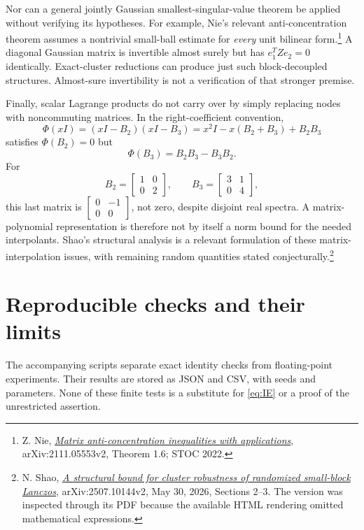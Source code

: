 \documentclass[11pt]{article}
\theoremstyle{definition}
\begin{document}
Nor can a general jointly Gaussian smallest-singular-value theorem be
applied without verifying its hypotheses. For example, Nie's relevant
anti-concentration theorem assumes a nontrivial small-ball estimate for
\emph{every} unit bilinear form.\footnote{Z. Nie,
\href{https://arxiv.org/html/2111.05553v2}{\emph{Matrix anti-concentration inequalities with applications}},
arXiv:2111.05553v2, Theorem 1.6; STOC 2022.}
A diagonal Gaussian matrix is invertible almost surely but has
$e_1^TZe_2=0$ identically. Exact-cluster reductions can produce just such
block-decoupled structures. Almost-sure invertibility is not a verification
of that stronger premise.

Finally, scalar Lagrange products do not carry over by simply replacing
nodes with noncommuting matrices. In the right-coefficient convention,
\[
 \Phi(xI)=(xI-B_2)(xI-B_3)
        =x^2I-x(B_2+B_3)+B_2B_3
\]
satisfies $\Phi(B_2)=0$ but
\[
 \Phi(B_3)=B_2B_3-B_3B_2.
\]
For
\[
 B_2=\begin{bmatrix}1&0\\0&2\end{bmatrix},\qquad
 B_3=\begin{bmatrix}3&1\\0&4\end{bmatrix},
\]
this last matrix is $\left[\begin{smallmatrix}0&-1\\0&0\end{smallmatrix}\right]$,
not zero, despite disjoint real spectra. A matrix-polynomial representation
is therefore not by itself a norm bound for the needed interpolants.
Shao's structural analysis is a relevant formulation of these
matrix-interpolation issues, with remaining random quantities stated
conjecturally.\footnote{N. Shao,
\href{https://arxiv.org/abs/2507.10144}{\emph{A structural bound for cluster robustness of randomized small-block Lanczos}},
arXiv:2507.10144v2, May 30, 2026, Sections 2--3. The version was inspected
through its PDF because the available HTML rendering omitted mathematical
expressions.}

\section{Reproducible checks and their limits}
\label{sec:checks}

The accompanying scripts separate exact identity checks from floating-point
experiments. Their results are stored as JSON and CSV, with seeds and
parameters. None of these finite tests is a substitute for
\eqref{eq:IE} or a proof of the unrestricted assertion.
\end{document}
